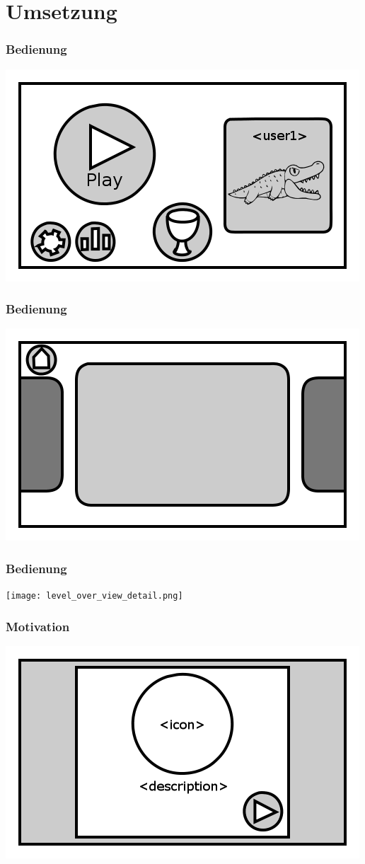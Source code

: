 \documentclass[t]{beamer}
\begin{document}
\section{Umsetzung}
\begin{frame}
	\frametitle{Bedienung}
	\includegraphics[height=\textheight]{main_menu.png}
\end{frame}
\begin{frame}
	\frametitle{Bedienung}
	\includegraphics[height=\textheight]{level_overview.png}
\end{frame}
\begin{frame}
	\frametitle{Bedienung}
	\texttt{[image: level\_over\_view\_detail.png]}
\end{frame}
\begin{frame}
	\frametitle{Motivation}
	\includegraphics[height=\textheight]{achievement_notification.png}
\end{frame}
\end{document}
